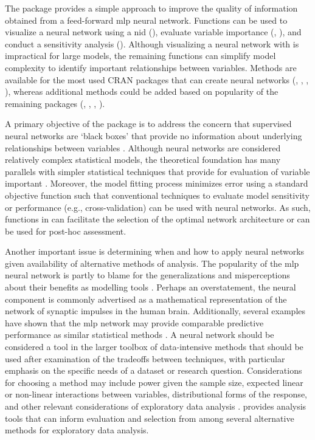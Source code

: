 \documentclass[article,shortnames]{jss}
\begin{document}
The  package provides a simple approach to improve the quality of information obtained from a feed-forward \ac{mlp} neural network.  Functions can be used to visualize a neural network using a \acl{nid} (), evaluate variable importance (, ), and conduct a sensitivity analysis ().  Although visualizing a neural network with  is impractical for large models, the remaining functions can simplify model complexity to identify important relationships between variables.  Methods are available for the most used \ac{CRAN} packages that can create neural networks (, , , ), whereas additional methods could be added based on popularity of the remaining packages (, , , ).  

A primary objective of the package is to address the concern that supervised neural networks are `black boxes' that provide no information about underlying relationships between variables \citep{Paruelo97,Olden02}.  Although neural networks are considered relatively complex statistical models, the theoretical foundation has many parallels with simpler statistical techniques that provide for evaluation of variable important \citep{Cheng94}.  Moreover, the model fitting process minimizes error using a standard objective function such that conventional techniques to evaluate model sensitivity or performance (e.g., cross-validation) can be used with neural networks.  As such, functions in  can facilitate the selection of the optimal network architecture or can be used for post-hoc assessment. 

Another important issue is determining when and how to apply neural networks given availability of alternative methods of analysis.  The popularity of the \ac{mlp} neural network is partly to blame  for the generalizations and misperceptions about their benefits as modelling tools \citep{Burke97}. Perhaps an overstatement, the neural component is commonly advertised as a mathematical representation of the network of synaptic impulses in the human brain.  Additionally, several examples have shown that the \ac{mlp} network may provide comparable predictive performance as similar statistical methods \citep{Feng02,Razi05,Beck14a}.  A neural network should be considered a tool in the larger toolbox of data-intensive methods that should be used after examination of the tradeoffs between techniques, with particular emphasis on the specific needs of a dataset or research question.  Considerations for choosing a method may include power given the sample size, expected linear or non-linear interactions between variables, distributional forms of the response, and other relevant considerations of exploratory data analysis \citep{Zuur10}.   provides analysis tools that can inform evaluation and selection from among several alternative methods for exploratory data analysis.
\end{document}
